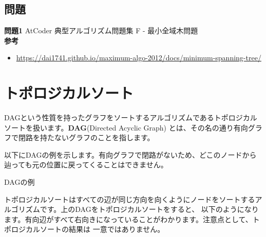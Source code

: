 \documentclass{jlreq}
\begin{document}
\subsection{問題}

\textbf{問題1} AtCoder 典型アルゴリズム問題集 F - 最小全域木問題\\

\textbf{参考}
\begin{itemize}
  \item \url{https://dai1741.github.io/maximum-algo-2012/docs/minimum-spanning-tree/}
\end{itemize}

\newpage

\section{トポロジカルソート}
DAGという性質を持ったグラフをソートするアルゴリズムであるトポロジカルソートを扱います。\textbf{DAG}(Directed Acyclic Graph)
とは、その名の通り有向グラフで閉路を持たないグラフのことを指します。

以下にDAGの例を示します。有向グラフで閉路がないため、どこのノードから辿っても元の位置に戻ってくることはできません。

\begin{center}
\end{center}

\begin{center}
  DAGの例
\end{center}

\vspace{0.5cm}

トポロジカルソートはすべての辺が同じ方向を向くようにノードをソートするアルゴリズムです。上のDAGをトポロジカルソートをすると、
以下のようになります。有向辺がすべて右向きになっていることがわかります。注意点として、トポロジカルソートの結果は
一意ではありません。
\end{document}
